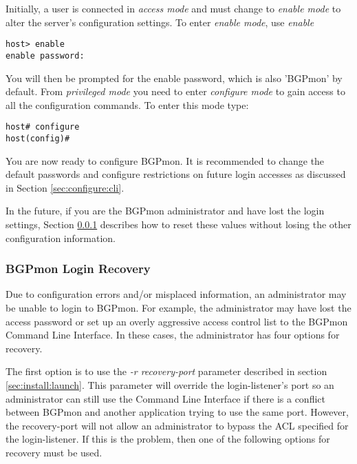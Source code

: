 Initially, a user is connected in \emph{access mode} and must change to \emph{enable mode} to alter the server's configuration settings.
To enter \emph{enable mode}, use \emph{enable}

\begin{Verbatim}[frame=single]
host> enable
enable password:
\end{Verbatim}

You will then be prompted for the enable password, which is also 'BGPmon' by default. From \emph{privileged mode} you need to enter \emph{configure mode} to gain access to all the configuration commands.  To enter this mode type:

\begin{Verbatim}[frame=single]
host# configure
host(config)#
\end{Verbatim}

You are now ready to configure BGPmon.
It is recommended to change the default passwords and configure restrictions on future login accesses as discussed in Section \ref{sec:configure:cli}.

In the future, if you are the BGPmon administrator and have lost the login settings,   Section \ref{sec:configure:loginrecovery} describes how to reset these values without losing the other configuration information.

\subsubsection{BGPmon Login Recovery}
\label{sec:configure:loginrecovery}

Due to configuration errors and/or misplaced information, an administrator may be unable to login to BGPmon.   For example, the administrator may have lost the access password or set up an overly aggressive access control list to the BGPmon Command Line Interface.  In these cases, the administrator has four options for recovery.

The first option is to use the \emph{-r recovery-port} parameter described in section \ref{sec:install:launch}.  This parameter will override the login-listener's port so an administrator can still use the Command Line Interface if there is a conflict between BGPmon and another application trying to use the same port.  However, the recovery-port will not allow an administrator to bypass the ACL specified for the login-listener.  If this is the problem, then one of the following options for recovery must be used.

